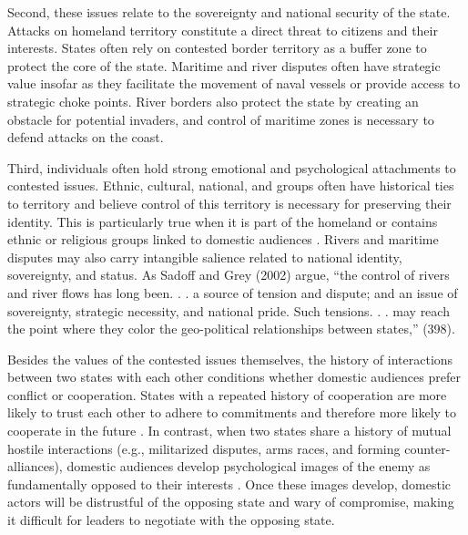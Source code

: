 \documentclass[../../dissertation.tex]{subfiles}
\begin{document}
Second, these issues relate to the sovereignty and national security of the state. Attacks on homeland territory constitute a direct threat to citizens and their interests. States often rely on contested border territory as a buffer zone to protect the core of the state. Maritime and river disputes often have strategic value insofar as they facilitate the movement of naval vessels or provide access to strategic choke points. River borders also protect the state by creating an obstacle for potential invaders, and control of maritime zones is necessary to defend attacks on the coast.

Third, individuals often hold strong emotional and psychological attachments to contested issues. Ethnic, cultural, national, and groups often have historical ties to territory and believe control of this territory is necessary for preserving their identity. This is particularly true when it is part of the homeland or contains ethnic or religious groups linked to domestic audiences \citep{gibler2012a, miller2013}. Rivers and maritime disputes may also carry intangible salience related to national identity, sovereignty, and status. As Sadoff and Grey (2002) argue, “the control of rivers and river flows has long been. . . a source of tension and dispute; and an issue of sovereignty, strategic necessity, and national pride. Such tensions. . . may reach the point where they color the geo-political relationships between states,” (398). 


Besides the values of the contested issues themselves, the history of interactions between two states with each other conditions whether domestic audiences prefer conflict or cooperation. States with a repeated history of cooperation are more likely to trust each other to adhere to commitments and therefore more likely to cooperate in the future \citep[e.g., ][]{axelrod1984}. In contrast, when two states share a history of mutual hostile interactions (e.g., militarized disputes, arms races, and forming counter-alliances), domestic audiences develop psychological images of the enemy as fundamentally opposed to their interests \citep{colaresi2007, senese2008, vasquez2009}. Once these images develop, domestic actors will be distrustful of the opposing state and wary of compromise, making it difficult for leaders to negotiate with the opposing state.

\end{document}
